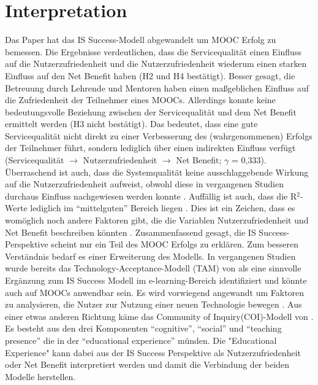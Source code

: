 \section{Interpretation}
\label{sec:vergleich}
Das Paper hat das IS Success-Modell abgewandelt um MOOC Erfolg zu bemessen.  
Die Ergebnisse verdeutlichen, dass die Servicequalität einen Einfluss auf die Nutzerzufriedenheit und die Nutzerzufriedenheit wiederum einen starken Einfluss auf den Net Benefit haben (H2 und H4 bestätigt). Besser gesagt, die Betreuung durch Lehrende und Mentoren haben einen maßgeblichen Einfluss auf die Zufriedenheit der Teilnehmer eines MOOCs. Allerdings konnte keine bedeutungsvolle Beziehung zwischen der Servicequalität und dem Net Benefit ermittelt werden (H3 nicht bestätigt). Das bedeutet, dass eine gute Servicequalität nicht direkt zu einer Verbesserung des (wahrgenommenen) Erfolgs der Teilnehmer führt, sondern lediglich über einen indirekten Einfluss verfügt (Servicequalität $\rightarrow$ Nutzerzufriedenheit $\rightarrow$ Net Benefit; $\gamma$ = 0,333). Überraschend ist auch, dass die Systemqualität keine ausschlaggebende Wirkung auf die Nutzerzufriedenheit aufweist, obwohl diese in vergangenen Studien durchaus Einfluss nachgewiesen werden konnte \parencite{freeze2010success, islam2013investigating, mohammadi2015factors}. 
Auffällig ist auch, dass die R$^2$-Werte lediglich im "`mittelguten"' Bereich liegen \parencite[vgl.][S.323]{chin1998partial}. Dies ist ein Zeichen, dass es womöglich noch andere Faktoren gibt, die die Variablen Nutzerzufriedenheit und Net Benefit beschreiben könnten \parencite[vgl.][S.179]{freeze2010success}.  
Zusammenfassend gesagt, die IS Success-Perspektive scheint nur ein Teil des MOOC Erfolgs zu erklären. Zum besseren Verständnis bedarf es einer Erweiterung des Modells. In vergangenen Studien wurde bereits das Technology-Acceptance-Modell (TAM) von \textcite{bagozzi1992development} als eine sinnvolle Ergänzung zum IS Success Modell im e-learning-Bereich identifiziert \parencite{mohammadi2015factors} und könnte auch auf MOOCs anwendbar sein. Es wird vorwiegend angewandt um Faktoren zu analysieren, die Nutzer zur Nutzung einer neuen Technologie bewegen \parencite[vgl.][S.702]{mohammadi2015factors}.  
Aus einer etwas anderen Richtung käme das Community of Inquiry(COI)-Modell von \textcite{garrison1999critical}. Es besteht aus den drei Komponenten "`cognitive"',  "`social"' und "`teaching presence"' die in der "`educational experience"'  münden. Die "Educational Experience" kann dabei aus der IS Success Perspektive als Nutzerzufriedenheit oder Net Benefit interpretiert werden und damit die Verbindung der beiden Modelle herstellen.  

